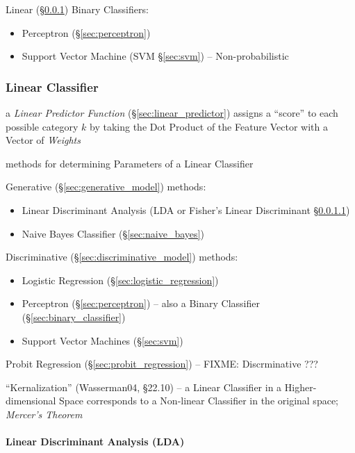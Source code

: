 Linear (\S\ref{sec:linear_classifier}) Binary Classifiers:
\begin{itemize}
  \item Perceptron (\S\ref{sec:perceptron})
  \item Support Vector Machine (SVM \S\ref{sec:svm}) -- Non-probabilistic
\end{itemize}



\subsubsection{Linear Classifier}\label{sec:linear_classifier}

a \emph{Linear Predictor Function} (\S\ref{sec:linear_predictor}) assigns a
``score'' to each possible category $k$ by taking the Dot Product of the Feature
Vector with a Vector of \emph{Weights}

methods for determining Parameters of a Linear Classifier

Generative (\S\ref{sec:generative_model}) methods:
\begin{itemize}
  \item Linear Discriminant Analysis (LDA or Fisher's Linear Discriminant
    \S\ref{sec:lda})
  \item Naive Bayes Classifier (\S\ref{sec:naive_bayes})
\end{itemize}

Discriminative (\S\ref{sec:discriminative_model}) methods:
\begin{itemize}
  \item Logistic Regression (\S\ref{sec:logistic_regression})
  \item Perceptron (\S\ref{sec:perceptron}) -- also a Binary Classifier
    (\S\ref{sec:binary_classifier})
  \item Support Vector Machines (\S\ref{sec:svm})
\end{itemize}

Probit Regression (\S\ref{sec:probit_regression}) -- FIXME: Discrminative ???

``Kernalization'' (Wasserman04, \S22.10) -- a Linear Classifier in a
Higher-dimensional Space corresponds to a Non-linear Classifier in the original
space; \emph{Mercer's Theorem}



\paragraph{Linear Discriminant Analysis (LDA)}\label{sec:lda}\hfill

